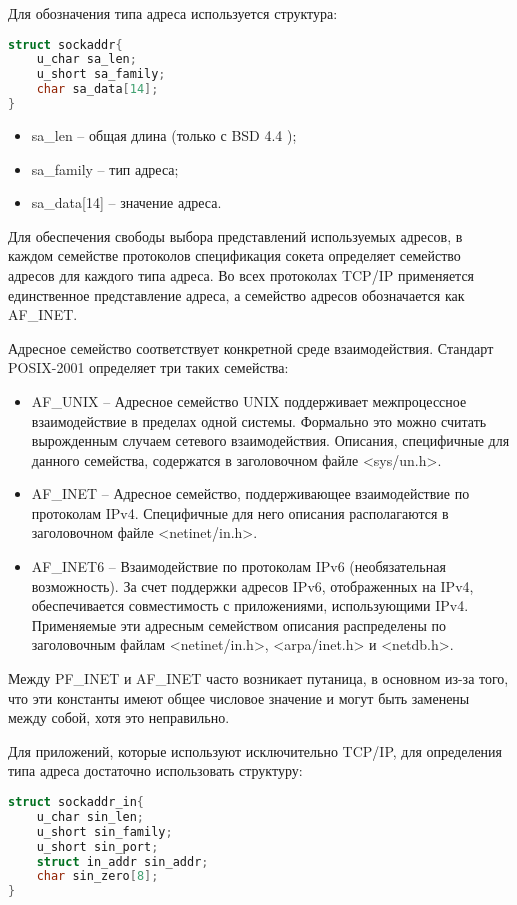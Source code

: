 Для обозначения типа адреса используется структура:

\begin{lstlisting}[language=C]
struct sockaddr{
	u_char sa_len;
	u_short sa_family;
	char sa_data[14];
}
\end{lstlisting}
\begin{itemize}
\item sa\_len -- общая длина (только с BSD 4.4 );
\item sa\_family -- тип адреса;
\item sa\_data[14] -- значение адреса.
\end{itemize}

Для обеспечения свободы выбора представлений используемых адресов,  в каждом семействе протоколов спецификация сокета определяет семейство адресов для каждого типа адреса. Во всех протоколах TCP/IP применяется единственное представление адреса,  а семейство адресов обозначается как AF\_INET.

Адресное семейство соответствует конкретной среде взаимодействия. Стандарт POSIX-2001 определяет три таких семейства:
\begin{itemize}
	\item AF\_UNIX -- Адресное семейство UNIX поддерживает межпроцессное взаимодействие в пределах одной системы. Формально это можно считать вырожденным случаем сетевого взаимодействия. Описания, специфичные для данного семейства, содержатся в заголовочном файле <sys/un.h>. 
	\item AF\_INET -- Адресное семейство, поддерживающее взаимодействие по протоколам IPv4. 
		Специфичные для него описания располагаются в заголовочном файле <netinet/in.h>. 
	\item AF\_INET6 -- Взаимодействие по протоколам IPv6 (необязательная возможность). 
		За счет поддержки адресов IPv6, отображенных на IPv4, обеспечивается совместимость с приложениями, 
		использующими IPv4. Применяемые эти адресным семейством описания распределены по заголовочным 
		файлам <netinet/in.h>, <arpa/inet.h> и <netdb.h>. 
\end{itemize}

Между PF\_INET и AF\_INET часто возникает путаница,  в основном из-за того,  что эти константы имеют общее числовое значение и могут быть заменены между собой,  хотя это неправильно.

Для приложений,  которые используют исключительно TCP/IP,  для определения типа адреса достаточно использовать структуру:
\begin{lstlisting}[language=C]
struct sockaddr_in{
	u_char sin_len;
	u_short sin_family;
	u_short sin_port;
	struct in_addr sin_addr;
	char sin_zero[8];
}
\end{lstlisting}

